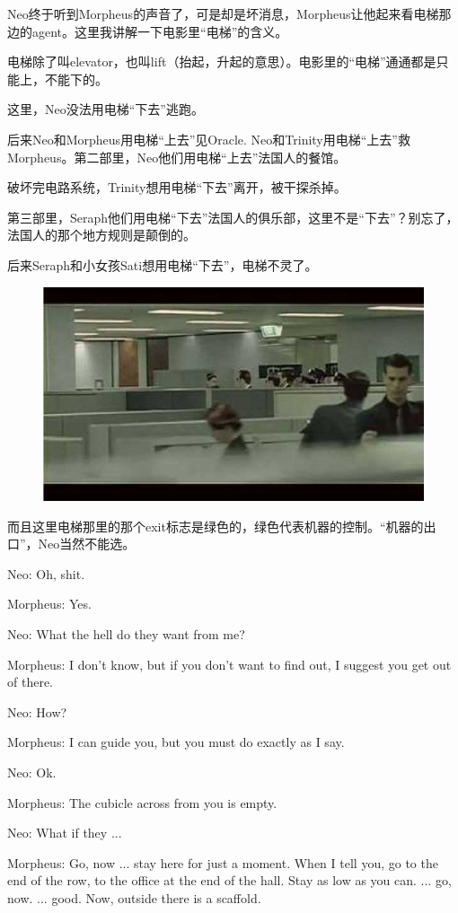 \documentclass[UTF8]{ctexart}
\newenvironment{myquote}{\color{green} \setlength{\leftskip}{6em} \setlength{\rightskip}{4em} \setlength{\parindent}{-2em}}{\par}
\begin{document}
Neo终于听到Morpheus的声音了，可是却是坏消息，Morpheus让他起来看电梯那边的agent。这里我讲解一下电影里“电梯”的含义。

电梯除了叫elevator，也叫lift（抬起，升起的意思）。电影里的“电梯”通通都是只能上，不能下的。

这里，Neo没法用电梯“下去”逃跑。

后来Neo和Morpheus用电梯“上去”见Oracle. Neo和Trinity用电梯“上去”救Morpheus。第二部里，Neo他们用电梯“上去”法国人的餐馆。

破坏完电路系统，Trinity想用电梯“下去”离开，被干探杀掉。

第三部里，Seraph他们用电梯“下去”法国人的俱乐部，这里不是“下去”？别忘了，法国人的那个地方规则是颠倒的。

后来Seraph和小女孩Sati想用电梯“下去”，电梯不灵了。

\begin{figure}[htb]
\centering
\includegraphics[width=0.5\linewidth]{fig/read_Matrix-8}
\end{figure}

而且这里电梯那里的那个exit标志是绿色的，绿色代表机器的控制。“机器的出口”，Neo当然不能选。

\begin{myquote}
Neo: Oh, shit.

Morpheus: Yes.

Neo: What the hell do they want from me?

Morpheus: I don't know, but if you don't want to find out, I suggest you get out of there.

Neo: How?

Morpheus: I can guide you, but you must do exactly as I say.

Neo: Ok.

Morpheus: The cubicle across from you is empty.

Neo: What if they ...

Morpheus: Go, now ... stay here for just a moment. When I tell you, go to the end of the row, to the office at the end of the hall. Stay as low as you can. ... go, now. ... good. Now, outside there is a scaffold.
\end{myquote}
\end{document}
